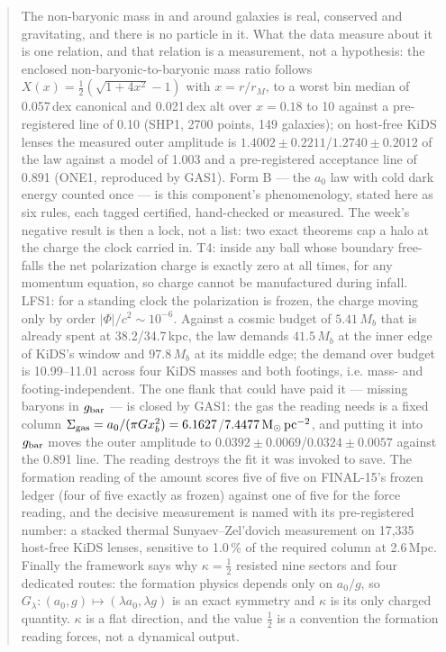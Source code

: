 \documentclass[10pt]{article}
\newcommand{\Msun}{\mathrm{M}_\odot}
\begin{document}
\begin{abstract}\noindent
The non-baryonic mass in and around galaxies is real, conserved and gravitating, and there is no particle in it.
What the data measure about it is one relation, and that relation is a measurement, not a hypothesis:
the enclosed non-baryonic-to-baryonic mass ratio follows $X(x)=\tfrac12(\sqrt{1+4x^2}-1)$ with $x=r/r_M$,
to a worst bin median of 0.057\,dex canonical and 0.021\,dex alt over $x=0.18$ to 10 against a pre-registered
line of 0.10 (SHP1, 2700 points, 149 galaxies); on host-free KiDS lenses the measured outer amplitude is
$1.4002\pm0.2211$/$1.2740\pm0.2012$ of the law against a model of 1.003 and a pre-registered acceptance line
of 0.891 (ONE1, reproduced by GAS1). Form B --- the $a_0$ law with cold dark energy counted once --- is this
component's phenomenology, stated here as six rules, each tagged certified, hand-checked or measured.
The week's negative result is then a lock, not a list: two exact theorems cap a halo at the charge the clock
carried in. T4: inside any ball whose boundary free-falls the net polarization charge is exactly zero at all
times, for any momentum equation, so charge cannot be manufactured during infall. LFS1: for a standing clock
the polarization is frozen, the charge moving only by order $|\Phi|/c^2\sim10^{-6}$. Against a cosmic budget of
$5.41\,M_b$ that is already spent at 38.2/34.7\,kpc, the law demands $41.5\,M_b$ at the inner edge of KiDS's
window and $97.8\,M_b$ at its middle edge; the demand over budget is 10.99--11.01 across four KiDS masses and
both footings, i.e. mass- and footing-independent. The one flank that could have paid it --- missing baryons in
$g_{\rm bar}$ --- is closed by GAS1: the gas the reading needs is a fixed column
$\Sigma_{\rm gas}=a_0/(\pi G x_b^2)=6.1627$/$7.4477\,\Msun\,{\rm pc}^{-2}$, and putting it into $g_{\rm bar}$
moves the outer amplitude to $0.0392\pm0.0069$/$0.0324\pm0.0057$ against the 0.891 line. The reading destroys
the fit it was invoked to save. The formation reading of the amount scores five of five on FINAL-15's frozen
ledger (four of five exactly as frozen) against one of five for the force reading, and the decisive
measurement is named with its pre-registered number: a stacked thermal Sunyaev--Zel'dovich measurement on
17,335 host-free KiDS lenses, sensitive to 1.0\,\% of the required column at 2.6\,Mpc. Finally the framework
says why $\kappa=\tfrac12$ resisted nine sectors and four dedicated routes: the formation physics depends only
on $a_0/g$, so $G_\lambda:(a_0,g)\mapsto(\lambda a_0,\lambda g)$ is an exact symmetry and $\kappa$ is its only
charged quantity. $\kappa$ is a flat direction, and the value $\tfrac12$ is a convention the formation reading
forces, not a dynamical output.
\end{abstract}
\end{document}
